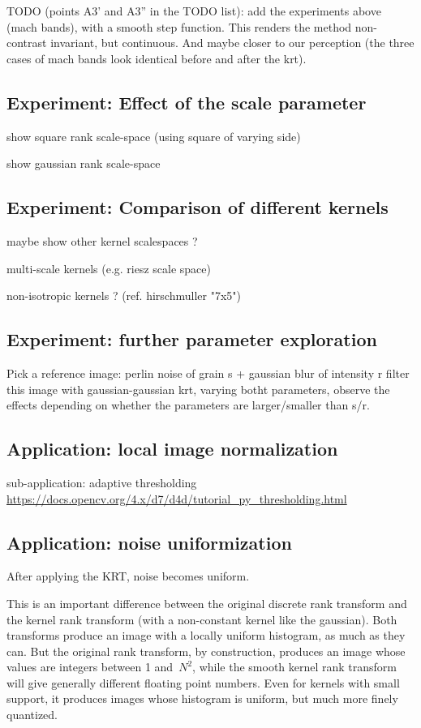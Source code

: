 \documentclass[12pt]{article}                  %
\begin{document}
TODO (points A3' and A3'' in the TODO list): add the experiments above (mach
bands), with a smooth step function.  This renders the method non-contrast
invariant, but continuous.  And maybe closer to our perception (the three
cases of mach bands look identical before and after the krt).

\subsection{Experiment: Effect of the scale parameter}

show square rank scale-space (using square of varying side)

show gaussian rank scale-space


\subsection{Experiment: Comparison of different kernels}

maybe show other kernel scalespaces ?

multi-scale kernels (e.g. riesz scale space)

non-isotropic kernels ?
(ref. hirschmuller "7x5")



\subsection{Experiment: further parameter exploration}

Pick a reference image:
perlin noise of grain s + gaussian blur of intensity r
filter this image with gaussian-gaussian krt, varying botht parameters,
observe the effects depending on whether the parameters are larger/smaller
than s/r.


\subsection{Application: local image normalization}

sub-application: adaptive thresholding
\url{https://docs.opencv.org/4.x/d7/d4d/tutorial_py_thresholding.html}

\subsection{Application: noise uniformization}

After applying the KRT, noise becomes uniform.

This is an important difference between the original discrete rank transform
and the kernel rank transform (with a non-constant kernel like the
gaussian).  Both transforms produce an image with a locally uniform
histogram, as much as they can.  But the original rank transform, by
construction, produces an image whose values are integers between 1
and~$N^2$, while the smooth kernel rank transform will give generally
different floating point numbers.  Even for kernels with small support, it
produces images whose histogram is uniform, but much more finely quantized.
\end{document}
